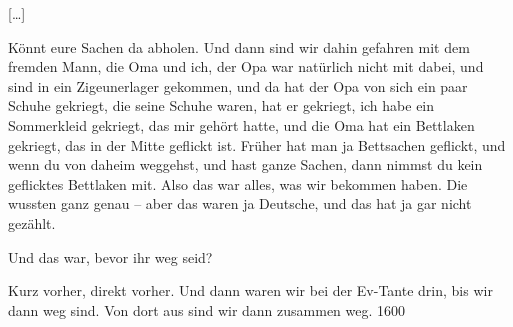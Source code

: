 \documentclass[ngerman,]{article}
\providecommand{\tightlist}{%
  \setlength{\itemsep}{0pt}\setlength{\parskip}{0pt}}
\begin{document}
\begin{multicols}{3}
{[}\ldots{}{]}

\begin{description}
\tightlist
\item[Käthe]
Könnt eure Sachen da abholen. Und dann sind wir dahin gefahren mit dem
fremden Mann, die Oma und ich, der Opa war natürlich nicht mit dabei,
und sind in ein Zigeunerlager gekommen, und da hat der Opa von sich ein
paar\,Schuhe gekriegt, die seine Schuhe waren, hat er gekriegt, ich habe
ein Sommerkleid gekriegt, das mir gehört hatte, und die Oma hat ein
Bettlaken gekriegt, das in der Mitte geflickt ist. Früher hat man ja
Bettsachen geflickt, und wenn du von daheim weggehst, und hast ganze
Sachen, dann nimmst du kein geflicktes Bettlaken mit. Also das war
alles, was wir bekommen haben. Die wussten ganz genau – aber das waren
ja Deutsche, und das hat ja gar nicht gezählt.
\item[Ruth]
Und das war, bevor ihr weg seid?
\item[Käthe]
Kurz vorher, direkt vorher. Und dann waren wir bei der Ev-Tante drin,
bis wir dann weg sind. Von dort aus sind wir dann zusammen weg. 1600
\end{description}
\end{multicols}
\end{document}
